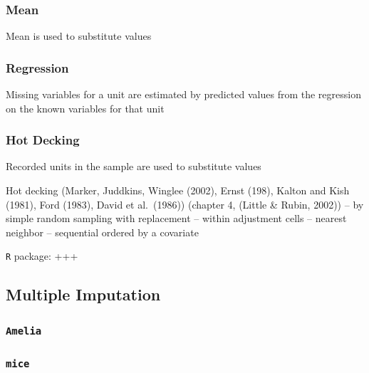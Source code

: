 \documentclass[12pt,econ]{sources/authesis}
\begin{document}
\hypertarget{ordmiss-theory-impute-mean}{%
\subsubsection{Mean}\label{ordmiss-theory-impute-mean}}

Mean is used to substitute values

\hypertarget{ordmiss-theory-impute-regress}{%
\subsubsection{Regression}\label{ordmiss-theory-impute-regress}}

Missing variables for a unit are estimated by predicted values from the regression on the known variables for that unit

\hypertarget{ordmiss-theory-impute-hd}{%
\subsubsection{Hot Decking}\label{ordmiss-theory-impute-hd}}

Recorded units in the sample are used to substitute values

Hot decking (Marker, Juddkins, Winglee (2002), Ernst (198), Kalton and Kish (1981), Ford (1983), David et al.~(1986)) (chapter 4, (Little \& Rubin, 2002))
-- by simple random sampling with replacement
-- within adjustment cells
-- nearest neighbor
-- sequential ordered by a covariate

\texttt{R} package: +++

\hypertarget{ordmiss-theory-multimpute}{%
\subsection{Multiple Imputation}\label{ordmiss-theory-multimpute}}

\hypertarget{ordmiss-theory-multimpute-amelia}{%
\subsubsection{\texorpdfstring{\texttt{Amelia}}{Amelia}}\label{ordmiss-theory-multimpute-amelia}}

\hypertarget{ordmiss-theory-multimpute-mice}{%
\subsubsection{\texorpdfstring{\texttt{mice}}{mice}}\label{ordmiss-theory-multimpute-mice}}
\end{document}
